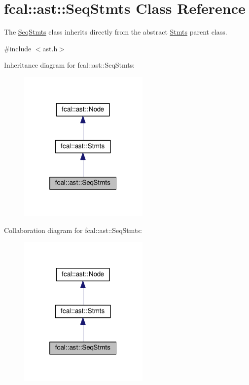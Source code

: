 \hypertarget{classfcal_1_1ast_1_1SeqStmts}{}\section{fcal\+:\+:ast\+:\+:Seq\+Stmts Class Reference}
\label{classfcal_1_1ast_1_1SeqStmts}


The \hyperlink{classfcal_1_1ast_1_1SeqStmts}{Seq\+Stmts} class inherits directly from the abstract \hyperlink{classfcal_1_1ast_1_1Stmts}{Stmts} parent class.  




{\ttfamily \#include $<$ast.\+h$>$}



Inheritance diagram for fcal\+:\+:ast\+:\+:Seq\+Stmts\+:\nopagebreak
\begin{figure}[H]
\begin{center}
\leavevmode
\includegraphics[width=181pt]{classfcal_1_1ast_1_1SeqStmts__inherit__graph}
\end{center}
\end{figure}


Collaboration diagram for fcal\+:\+:ast\+:\+:Seq\+Stmts\+:\nopagebreak
\begin{figure}[H]
\begin{center}
\leavevmode
\includegraphics[width=181pt]{classfcal_1_1ast_1_1SeqStmts__coll__graph}
\end{center}
\end{figure}
